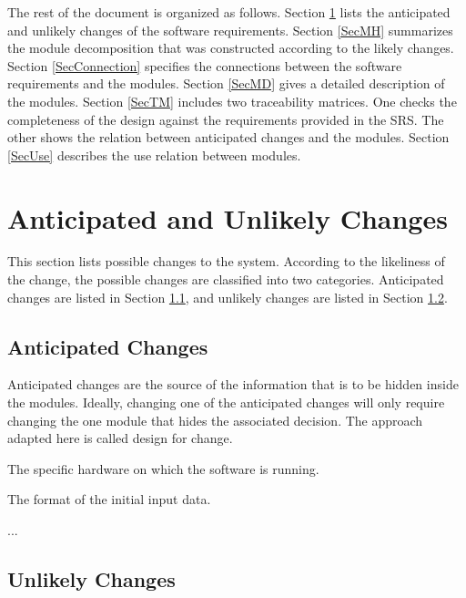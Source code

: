 \documentclass[12pt, titlepage]{article}
\newcounter{acnum}
\newcommand{\actheacnum}{AC\theacnum}
\begin{document}
The rest of the document is organized as follows. Section
\ref{SecChange} lists the anticipated and unlikely changes of the software
requirements. Section \ref{SecMH} summarizes the module decomposition that
was constructed according to the likely changes. Section \ref{SecConnection}
specifies the connections between the software requirements and the
modules. Section \ref{SecMD} gives a detailed description of the
modules. Section \ref{SecTM} includes two traceability matrices. One checks
the completeness of the design against the requirements provided in the SRS. The
other shows the relation between anticipated changes and the modules. Section
\ref{SecUse} describes the use relation between modules.

\section{Anticipated and Unlikely Changes} \label{SecChange}

This section lists possible changes to the system. According to the likeliness
of the change, the possible changes are classified into two
categories. Anticipated changes are listed in Section \ref{SecAchange}, and
unlikely changes are listed in Section \ref{SecUchange}.

\subsection{Anticipated Changes} \label{SecAchange}

Anticipated changes are the source of the information that is to be hidden
inside the modules. Ideally, changing one of the anticipated changes will only
require changing the one module that hides the associated decision. The approach
adapted here is called design for
change.

\begin{description}
\item[ \actheacnum \label{acHardware}:] The specific
  hardware on which the software is running.
\item[ \actheacnum \label{acInput}:] The format of the
  initial input data.
\item ...
\end{description}

\subsection{Unlikely Changes} \label{SecUchange}
\end{document}
